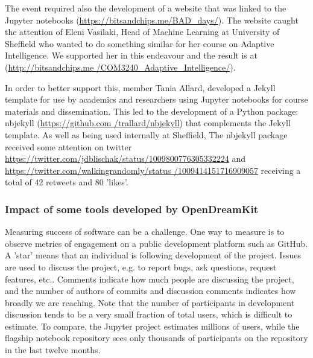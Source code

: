 \begin{enumerate}
The event required also the development of a website that was linked to the Jupyter notebooks (\url{https://bitsandchips.me/BAD_days/}). The
website caught the attention of Eleni Vasilaki, Head of Machine Learning at University of Sheffield who wanted to do something similar for
her course on Adaptive Intelligence. We supported her in this endeavour and the result is at (\url{http://bitsandchips.me
/COM3240_Adaptive_Intelligence/}).

In order to better support this, \ODK member Tania Allard, developed a Jekyll template for use by academics and researchers using Jupyter
notebooks for course materials and dissemination. This led to the development of a Python package: nbjekyll (\url{https://github.com
/trallard/nbjekyll}) that complements the Jekyll template. As well as being used internally at Sheffield, The nbjekyll package received some
attention on twitter \url{https://twitter.com/jdblischak/status/1009800776305332224} and \url{https://twitter.com/walkingrandomly/status
/1009414151716909057} receiving a total of 42 retweets and 80 'likes'.
\end{enumerate}

\subsubsection{Impact of some tools developed by OpenDreamKit}



Measuring success of software can be a challenge.
One way to measure is to observe metrics of engagement on
a public development platform such as GitHub.
A 'star' means that an individual is following development of the project.
Issues are used to discuss the project, e.g. to report bugs, ask questions, request features, etc..
Comments indicate how much people are discussing the project,
and the number of authors of commits and discussion comments indicates
how broadly we are reaching.
Note that the number of participants in development discussion tends to be a very small fraction of total users,
which is difficult to estimate.
To compare, the Jupyter project estimates millions of users,
while the flagship notebook repository sees only thousands of participants on the repository in the last twelve months.

